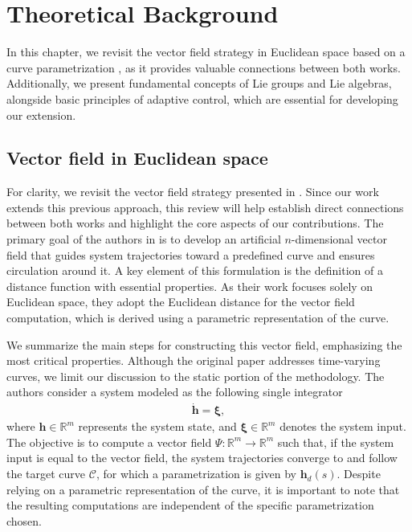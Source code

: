 \chapter{Theoretical Background}\label{ch:background}
In this chapter, we revisit the vector field strategy in Euclidean space based on a curve parametrization \citep{Rezende2022}, as it provides valuable connections between both works. Additionally, we present fundamental concepts of Lie groups and Lie algebras, alongside basic principles of adaptive control, which are essential for developing our extension.

\section{Vector field in Euclidean space}\label{sec:adriano-review}
For clarity, we revisit the vector field strategy presented in \citet{Rezende2022}. Since our work extends this previous approach, this review will help establish direct connections between both works and highlight the core aspects of our contributions. The primary goal of the authors in \citet{Rezende2022} is to develop an artificial $n$-dimensional vector field that guides system trajectories toward a predefined curve and ensures circulation around it. A key element of this formulation is the definition of a distance function with essential properties. As their work focuses solely on Euclidean space, they adopt the Euclidean distance for the vector field computation, which is derived using a parametric representation of the curve.

We summarize the main steps for constructing this vector field, emphasizing the most critical properties. Although the original paper addresses time-varying curves, we limit our discussion to the static portion of the methodology. The authors consider a system modeled as the following single integrator 
\begin{align}
    \dot{\mathbf{h}} = \boldsymbol{\xi}, \label{eq:adriano-single-integrator}
\end{align}
where $\mathbf{h}\in\mathbb{R}^m$ represents the system state, and $\boldsymbol{\xi}\in\mathbb{R}^m$ denotes the system input. The objective is to compute a vector field $\Psi:\mathbb{R}^m\to\mathbb{R}^m$ such that, if the system input is equal to the vector field, the system trajectories converge to and follow the target curve $\mathcal{C}$, for which a parametrization is given by $\mathbf{h}_d(s)$. Despite relying on a parametric representation of the curve, it is important to note that the resulting computations are independent of the specific parametrization chosen.

